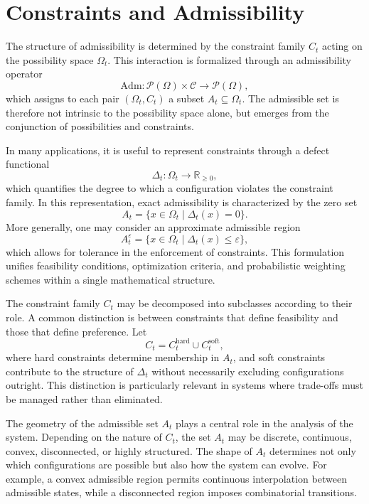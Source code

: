 \documentclass[11pt,oneside]{article}
\begin{document}
\section{Constraints and Admissibility}

The structure of admissibility is determined by the constraint family \( C_t \) acting on the possibility space \( \Omega_t \). This interaction is formalized through an admissibility operator
\[
\mathrm{Adm} : \mathcal{P}(\Omega) \times \mathcal{C} \to \mathcal{P}(\Omega),
\]
which assigns to each pair \( (\Omega_t, C_t) \) a subset \( A_t \subseteq \Omega_t \). The admissible set is therefore not intrinsic to the possibility space alone, but emerges from the conjunction of possibilities and constraints.

In many applications, it is useful to represent constraints through a defect functional
\[
\Delta_t : \Omega_t \to \mathbb{R}_{\ge 0},
\]
which quantifies the degree to which a configuration violates the constraint family. In this representation, exact admissibility is characterized by the zero set
\[
A_t = \{ x \in \Omega_t \mid \Delta_t(x) = 0 \}.
\]
More generally, one may consider an approximate admissible region
\[
A_t^{\varepsilon} = \{ x \in \Omega_t \mid \Delta_t(x) \le \varepsilon \},
\]
which allows for tolerance in the enforcement of constraints. This formulation unifies feasibility conditions, optimization criteria, and probabilistic weighting schemes within a single mathematical structure.

The constraint family \( C_t \) may be decomposed into subclasses according to their role. A common distinction is between constraints that define feasibility and those that define preference. Let
\[
C_t = C_t^{\mathrm{hard}} \cup C_t^{\mathrm{soft}},
\]
where hard constraints determine membership in \( A_t \), and soft constraints contribute to the structure of \( \Delta_t \) without necessarily excluding configurations outright. This distinction is particularly relevant in systems where trade-offs must be managed rather than eliminated.

The geometry of the admissible set \( A_t \) plays a central role in the analysis of the system. Depending on the nature of \( C_t \), the set \( A_t \) may be discrete, continuous, convex, disconnected, or highly structured. The shape of \( A_t \) determines not only which configurations are possible but also how the system can evolve. For example, a convex admissible region permits continuous interpolation between admissible states, while a disconnected region imposes combinatorial transitions.
\end{document}
